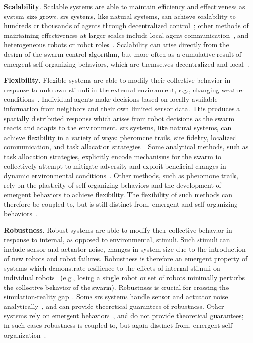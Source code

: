 \textbf{Scalability}. Scalable systems are able to maintain efficiency and
effectiveness as system size grows. \gls{srs} systems, like natural systems, can
achieve scalability to hundreds or thousands of agents through decentralized
control~\cite{Matthey2009}; other methods of maintaining effectiveness at larger
scales include local agent communication~\cite{Agassounon2001,Lerman2006}, and
heterogeneous robots or robot roles~\cite{Lu2020,Harwell2019a}.  Scalability
can arise directly from the design of the swarm control algorithm, but more
often as a cumulative result of emergent self-organizing behaviors, which
are themselves decentralized and local~\cite{DeWolf2005}.

\textbf{Flexibility}. Flexible systems are able to modify their collective
behavior in response to unknown stimuli in the external environment, e.g.,
changing weather conditions~\cite{Harwell2019a,Just2017,Hunt2020}. Individual
agents make decisions based on locally available information from neighbors and
their own limited sensor data. This produces a spatially distributed response
which arises from robot decisions as the swarm reacts and adapts to the
environment. \gls{srs} systems, like natural systems, can achieve flexibility in a
variety of ways: pheromone trails, site fidelity, localized communication, and
task allocation strategies~\cite{Just2017,Harwell2019a}. Some analytical methods,
such as task allocation strategies, explicitly encode mechanisms for the swarm
to collectively attempt to mitigate adversity and exploit beneficial changes in
dynamic environmental conditions~\cite{Just2017,Winfield2008}. Other methods,
such as pheromone trails, rely on the plasticity of self-organizing behaviors
and the development of emergent behaviors to achieve flexibility. The
flexibility of such methods can therefore be coupled to, but is still distinct
from, emergent and self-organizing behaviors~\cite{DeWolf2005}.

\textbf{Robustness}. Robust systems are able to modify their collective behavior
in response to internal, as opposed to environmental, stimuli.  Such stimuli can
include sensor and actuator noise, changes in system size due to the
introduction of new robots and robot failures.  Robustness is therefore an
emergent property of systems which demonstrate resilience to the effects of
internal stimuli on individual robots~\cite{DeWolf2005} (e.g., losing a single
robot or set of robots minimally perturbs the collective behavior of the swarm).
Robustness is crucial for crossing the simulation-reality
gap~\cite{Hecker2015,Francesca2014}.  Some \gls{srs} systems handle sensor and
actuator noise
analytically~\cite{Dallalibera2011,Claudi2014,Zong2006,Nurzaman2009,Turgut2008},
and can provide theoretical guarantees of robustness.  Other systems rely on
emergent behaviors~\cite{Harwell2020a}, and do not provide theoretical
guarantees; in such cases robustness is coupled to, but again distinct from,
emergent self-organization~\cite{Hunt2020,DeWolf2005}.

